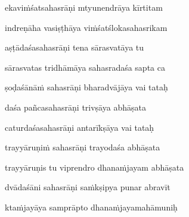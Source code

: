 ekaviṁśatsahasrāṇi mtyunendrāya kīrtitam\thinspace{\dandab} \dontdisplaylinenum 

indreṇāha vasiṣṭhāya viṁśatślokasahasrikam \veg\dontdisplaylinenum
{}

aṣṭādaśasahasrāṇi tena sārasvatāya tu\thinspace{\dandab} \dontdisplaylinenum

sārasvatas tridhāmāya sahasradaśa sapta ca \veg\dontdisplaylinenum
{}

ṣoḍaśānāṁ sahasrāṇi bharadvājāya vai tataḥ\thinspace{\dandab} \dontdisplaylinenum

daśa pañcasahasrāṇi trivṣāya abhāṣata \veg\dontdisplaylinenum
{}

caturdaśasahasrāṇi antarīkṣāya vai tataḥ\thinspace{\dandab} \dontdisplaylinenum

trayyāruṇiṁ sahasrāṇi trayodaśa abhāṣata \veg\dontdisplaylinenum
{}

trayyāruṇis tu viprendro dhanaṁjayam abhāṣata\thinspace{\dandab} \dontdisplaylinenum

dvādaśāni sahasrāṇi saṁkṣipya punar abravīt \veg\dontdisplaylinenum
{}

ktaṁjayāya samprāpto dhanaṁjayamahāmuniḥ\thinspace{\dandab} \dontdisplaylinenum

